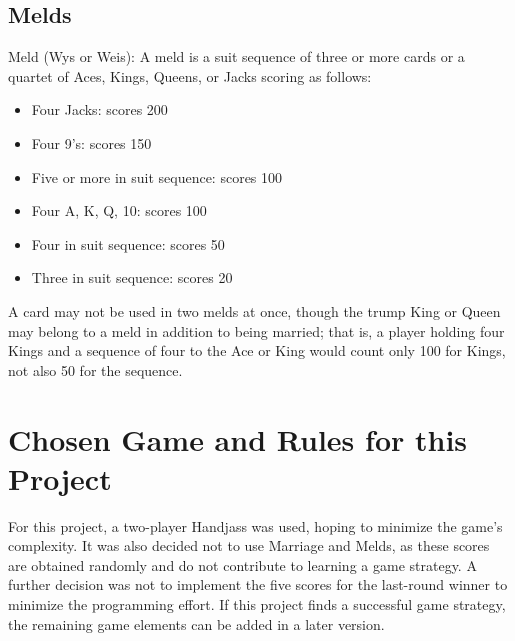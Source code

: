 \subsection{Melds}
Meld (Wys or Weis): A meld is a suit sequence of three or more cards or a quartet of Aces, Kings, Queens, or Jacks scoring as follows:
    
\begin{itemize}
    \item Four Jacks: scores 200
    \item Four 9's: scores 150
    \item Five or more in suit sequence: scores 100
    \item Four A, K, Q, 10: scores 100
    \item Four in suit sequence: scores 50
    \item Three in suit sequence: scores 20
\end{itemize} 
        
A card may not be used in two melds at once, though the trump King or Queen may belong to a meld in addition to being married; that is, a player holding four Kings and a sequence of four to the Ace or King would count only 100 for Kings, not also 50 for the sequence.



\section{Chosen Game and Rules for this Project}
For this project, a two-player Handjass was used, hoping to minimize the game's complexity. It was also decided not to use Marriage and Melds, as these scores are obtained randomly and do not contribute to learning a game strategy. A further decision was not to implement the five scores for the last-round winner to minimize the programming effort.
If this project finds a successful game strategy, the remaining game elements can be added in a later version.\\






